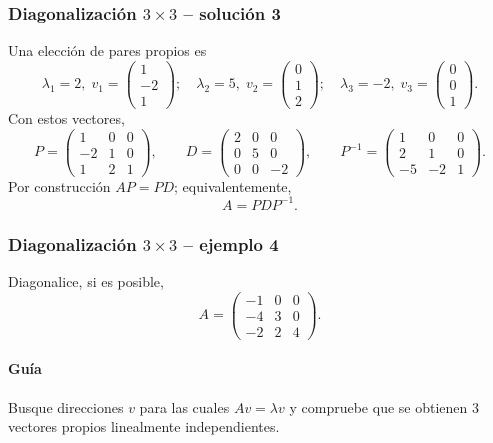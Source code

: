 \subsubsection*{Diagonalización $3\times 3$ -- solución 3}
\scriptsize
Una elección de pares propios es
\[
\lambda_1=2,\;v_1=\begin{pmatrix}1\\-2\\1\end{pmatrix};\quad \lambda_2=5,\;v_2=\begin{pmatrix}0\\1\\2\end{pmatrix};\quad \lambda_3=-2,\;v_3=\begin{pmatrix}0\\0\\1\end{pmatrix}.
\]
Con estos vectores,
\[
P=\begin{pmatrix}1 & 0 & 0\\-2 & 1 & 0\\1 & 2 & 1\end{pmatrix},\qquad D=\begin{pmatrix}2 & 0 & 0\\0 & 5 & 0\\0 & 0 & -2\end{pmatrix},\qquad P^{-1}=\begin{pmatrix}1 & 0 & 0\\2 & 1 & 0\\-5 & -2 & 1\end{pmatrix}.
\]
Por construcción $AP=PD$; equivalentemente,
\[
\boxed{A=PDP^{-1}}.
\]


\subsubsection*{Diagonalización $3\times 3$ -- ejemplo 4}

Diagonalice, si es posible,
\[
A=\begin{pmatrix}-1 & 0 & 0\\-4 & 3 & 0\\-2 & 2 & 4\end{pmatrix}.
\]

\paragraph{Guía}
Busque direcciones $v$ para las cuales $Av=\lambda v$ y compruebe que se obtienen $3$ vectores propios linealmente independientes.



